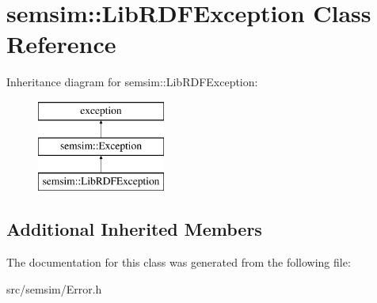 \hypertarget{classsemsim_1_1LibRDFException}{}\section{semsim\+:\+:Lib\+R\+D\+F\+Exception Class Reference}
\label{classsemsim_1_1LibRDFException}
Inheritance diagram for semsim\+:\+:Lib\+R\+D\+F\+Exception\+:\begin{figure}[H]
\begin{center}
\leavevmode
\includegraphics[height=3.000000cm]{classsemsim_1_1LibRDFException}
\end{center}
\end{figure}
\subsection*{Additional Inherited Members}


The documentation for this class was generated from the following file\+:\begin{DoxyCompactItemize}
\item 
src/semsim/Error.\+h\end{DoxyCompactItemize}
